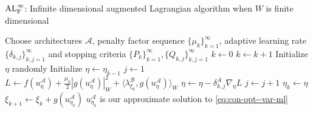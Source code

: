 \begin{algorithm}[!ht]
\caption{${\rm AL}^\infty_{\rm F}$: Infinite dimensional augmented Lagrangian algorithm when $W$ is finite dimensional}
\label{algo:dl-al-finite--var-ml}
\begin{algorithmic}[1]
    \STATE Choose architectures $\mathcal A$, penalty factor sequence $\{\mu_k\}_{k=1}^\infty$, adaptive learning rate $\{\delta_{k, j}\}_{k, j=1}^\infty$ and stopping criteria $\{P_k\}_{k=1}^\infty, \{Q_{k, j}\}_{k, j=1}^\infty$
    \STATE $k\leftarrow0$
        \STATE $k \leftarrow k+1$
                \STATE Initialize $\eta$ randomly
        \ELSE
                \STATE Initialize $\eta\leftarrow \eta_{k-1}$
        \ENDIF
        \STATE $j\leftarrow 1$
            \STATE $L\leftarrow f(u_{\eta}^{\mathcal A})+\frac{\mu_k}{2}|g(u_{\eta}^{\mathcal A})|^2_W + \langle\lambda_{\xi_k}^{\mathcal B}, g(u_{\eta}^{\mathcal A})\rangle_W$
            \STATE $\eta\leftarrow\eta-\delta_{k, j}^A\nabla_\eta L$
            \STATE $j\leftarrow j+1$
        \ENDWHILE
        \STATE $\eta_k\leftarrow\eta$
        \STATE $\xi_{k+1}\leftarrow\xi_k + g(u_{\eta_k}^{\mathcal A})$
    \ENDWHILE
    \STATE $u_{\eta_k}^{\mathcal A}$ is our approximate solution to \eqref{eq:con-opt--var-ml}
\end{algorithmic}
\end{algorithm}


